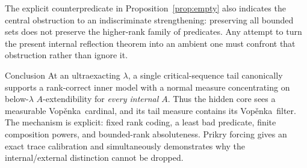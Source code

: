 \documentclass[11pt,letterpaper]{article}
\theoremstyle{definition}
\numberwithin{equation}{section}
\newcommand{\Vop}{Vop\v{e}nka}
\begin{document}
The explicit counterpredicate in Proposition~\ref{prop:empty} also indicates the central obstruction to an indiscriminate strengthening: preserving all bounded sets does not preserve the higher-rank family of predicates. Any attempt to turn the present internal reflection theorem into an ambient one must confront that obstruction rather than ignore it.

\begin{assessment}{Conclusion}
At an ultraexacting $\lambda$, a single critical-sequence tail canonically supports a rank-correct inner model with a normal measure concentrating on below-$\lambda$ $A$-extendibility for \emph{every internal $A$}. Thus the hidden core sees a measurable \Vop\ cardinal, and its tail measure contains its \Vop\ filter. The mechanism is explicit: fixed rank coding, a least bad predicate, finite composition powers, and bounded-rank absoluteness. Prikry forcing gives an exact trace calibration and simultaneously demonstrates why the internal/external distinction cannot be dropped.
\end{assessment}
\end{document}
